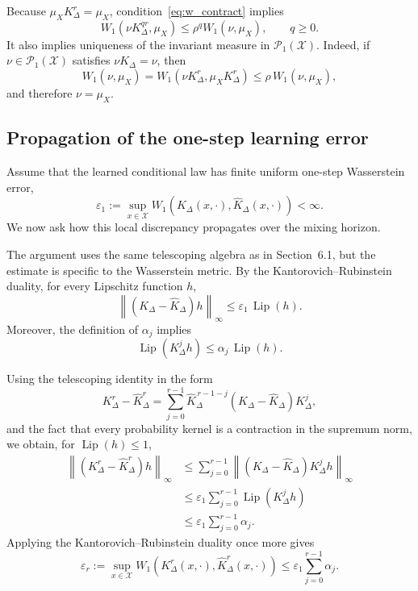 \documentclass[final,hidelinks]{siamart251216}
\newcommand{\cX}{\mathcal{X}}
\newcommand{\Wone}{W_1}
\begin{document}
Because $\mu_XK_\Delta^r=\mu_X$, condition~\eqref{eq:w_contract} implies
\[
    \Wone(\nu K_\Delta^{qr},\mu_X)
    \le
    \rho^q\Wone(\nu,\mu_X),
    \qquad q\ge0.
\]
It also implies uniqueness of the invariant measure in
$\mathcal P_1(\cX)$. Indeed, if $\nu\in\mathcal P_1(\cX)$ satisfies
$\nu K_\Delta=\nu$, then
\[
    \Wone(\nu,\mu_X)
    =
    \Wone(\nu K_\Delta^r,\mu_XK_\Delta^r)
    \le
    \rho\,\Wone(\nu,\mu_X),
\]
and therefore $\nu=\mu_X$.

\subsection{Propagation of the one-step learning error}

Assume that the learned conditional law has finite uniform one-step
Wasserstein error,
\begin{equation}
    \varepsilon_1
    :=
    \sup_{x\in\cX}
    \Wone\!\left(
        K_\Delta(x,\cdot),
        \widehat K_\Delta(x,\cdot)
    \right)<\infty.
    \label{eq:w_one_step_error}
\end{equation}
We now ask how this local discrepancy propagates over the mixing horizon.

The argument uses the same telescoping algebra as in Section~6.1, but the
estimate is specific to the Wasserstein metric. By the
Kantorovich--Rubinstein duality, for every Lipschitz function $h$,
\[
    \left\|
        (K_\Delta-\widehat K_\Delta)h
    \right\|_\infty
    \le
    \varepsilon_1\,\operatorname{Lip}(h).
\]
Moreover, the definition of $\alpha_j$ implies
\[
    \operatorname{Lip}(K_\Delta^j h)
    \le
    \alpha_j\,\operatorname{Lip}(h).
\]

Using the telescoping identity in the form
\[
    K_\Delta^r-\widehat K_\Delta^r
    =
    \sum_{j=0}^{r-1}
    \widehat K_\Delta^{\,r-1-j}
    (K_\Delta-\widehat K_\Delta)
    K_\Delta^j,
\]
and the fact that every probability kernel is a contraction in the
supremum norm, we obtain, for $\operatorname{Lip}(h)\le1$,
\begin{align*}
    \left\|
        (K_\Delta^r-\widehat K_\Delta^r)h
    \right\|_\infty
    &\le
    \sum_{j=0}^{r-1}
    \left\|
        (K_\Delta-\widehat K_\Delta)
        K_\Delta^j h
    \right\|_\infty \\
    &\le
    \varepsilon_1
    \sum_{j=0}^{r-1}
    \operatorname{Lip}(K_\Delta^j h) \\
    &\le
    \varepsilon_1
    \sum_{j=0}^{r-1}\alpha_j .
\end{align*}
Applying the Kantorovich--Rubinstein duality once more gives
\begin{equation}
    \varepsilon_r
    :=
    \sup_{x\in\cX}
    \Wone\!\left(
        K_\Delta^r(x,\cdot),
        \widehat K_\Delta^r(x,\cdot)
    \right)
    \le
    \varepsilon_1
    \sum_{j=0}^{r-1}\alpha_j .
    \label{eq:w_kernel_error}
\end{equation}
\end{document}
